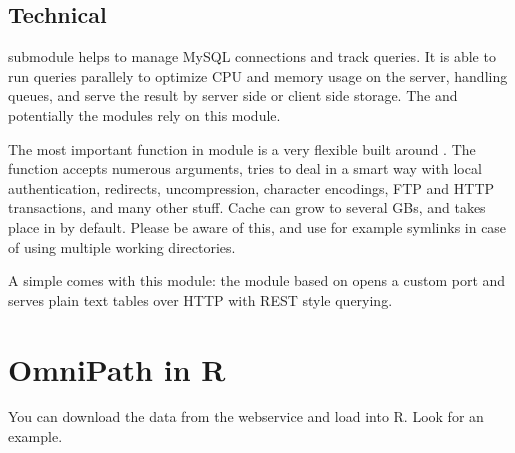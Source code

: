 \documentclass[letterpaper,10pt,english]{sphinxmanual}
\begin{document}
\section{Technical}
\label{\detokenize{index:technical}}
 submodule helps to manage MySQL connections and track queries. It is
able to run queries parallely to optimize CPU and memory usage on the server,
handling queues, and serve the result by server side or client side storage.
The  and potentially the  modules rely on this 
module.

The most important function in module  is a very flexible  built around . The function  accepts
numerous arguments, tries to deal in a smart way with local 
authentication, redirects, uncompression, character encodings, FTP and HTTP
transactions, and many other stuff. Cache can grow to several GBs, and takes
place in  by default. Please be aware of this, and use for example
symlinks in case of using multiple working directories.

A simple  comes with this module: the  module based on
 opens a custom port and serves plain text tables over
HTTP with REST style querying.


\chapter{OmniPath in R}
\label{\detokenize{index:omnipath-in-r}}
You can download the data from the webservice and load into R. Look
 for an
example.


\renewcommand{\indexname}{Python Module Index}
\begin{sphinxtheindex}
\let\bigletter\sphinxstyleindexlettergroup
\bigletter{p}
\item\relax{}
\item\relax{}
\item\relax{}
\item\relax{}
\item\relax{}
\item\relax{}
\end{sphinxtheindex}

\renewcommand{\indexname}{Index}
\printindex
\end{document}
